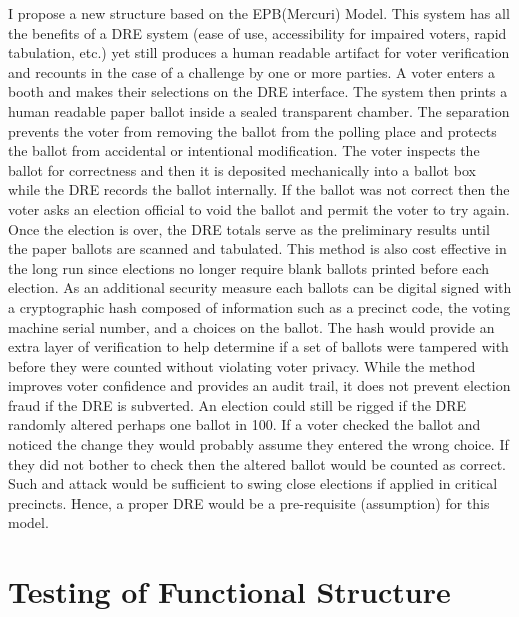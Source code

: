 \documentclass{article}
\begin{document}
I propose a new structure based on the EPB(Mercuri) Model. This system has all the benefits of a DRE system (ease of use, accessibility for impaired voters, rapid tabulation, etc.) yet still produces a human readable artifact for voter verification and recounts in the case of a challenge by one or more parties. A voter enters a booth and makes their selections on the DRE interface. The system then prints a human readable paper ballot inside a sealed transparent chamber. The separation prevents the voter from removing the ballot from the polling place and protects the ballot from accidental or intentional modification. The voter inspects the ballot for correctness and then it is deposited mechanically into a ballot box while the DRE records the ballot internally. If the ballot was not correct then the voter asks an election official to void the ballot and permit the voter to try again. Once the election is over, the DRE totals serve as the preliminary results until the paper ballots are scanned and tabulated. This method is also cost effective in the long run since elections no longer require blank ballots printed before each election. As an additional security measure each ballots can be digital signed with a cryptographic hash composed of information such as a precinct code, the voting machine serial number, and a choices on the ballot. The hash would provide an extra layer of verification to help determine if a set of ballots were tampered with before they were counted without violating voter privacy. While the method improves voter confidence and provides an audit trail, it does not prevent election fraud if the DRE is subverted. An election could still be rigged if the DRE randomly altered perhaps one ballot in 100. If a voter checked the ballot and noticed the change they would probably assume they entered the wrong choice. If they did not bother to check then the altered ballot would be counted as correct. Such and attack would be sufficient to swing close elections if applied in critical precincts. Hence, a proper DRE would be a pre-requisite (assumption) for this model.


\section{Testing of Functional Structure}
\end{document}
